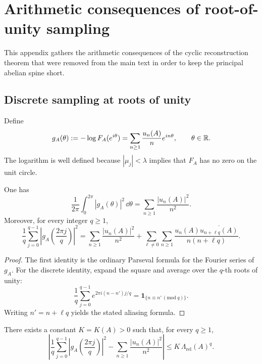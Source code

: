 \section{Arithmetic consequences of root-of-unity sampling}
\label{app:arithmetic}

This appendix gathers the arithmetic consequences of the cyclic reconstruction theorem that were removed from the main text in order to keep the principal abelian spine short.

\subsection{Discrete sampling at roots of unity}

Define
\[
  g_A(\theta):=-\log F_A(e^{i\theta})
  =\sum_{n\ge 1}\frac{u_n(A)}{n}e^{in\theta},
  \qquad \theta\in\mathbb{R}.
\]
The logarithm is well defined because \(|\mu_j|<\lambda\) implies that
\(F_A\) has no zero on the unit circle.

\begin{theorem}
  \label{thm:finite-part-nyquist-parseval-aliasing}
  One has
  \[
    \frac{1}{2\pi}\int_0^{2\pi}|g_A(\theta)|^2\,\dd\theta
    =\sum_{n\ge 1}\frac{|u_n(A)|^2}{n^2}.
  \]
  Moreover, for every integer \(q\ge 1\),
  \[
    \frac{1}{q}\sum_{j=0}^{q-1}
      \left|g_A\!\left(\frac{2\pi j}{q}\right)\right|^2
    =
    \sum_{n\ge 1}\frac{|u_n(A)|^2}{n^2}
    +\sum_{\ell\ne 0}\sum_{n\ge 1}
      \frac{u_n(A)\overline{u_{n+\ell q}(A)}}{n(n+\ell q)}.
  \]
\end{theorem}

\begin{proof}
  The first identity is the ordinary Parseval formula for the Fourier
  series of \(g_A\). For the discrete identity, expand the square and
  average over the \(q\)-th roots of unity:
  \[
    \frac{1}{q}\sum_{j=0}^{q-1}
      e^{2\pi i (n-n')j/q}
    =\mathbf 1_{\{n\equiv n'\,(\mathrm{mod}\ q)\}}.
  \]
  Writing \(n'=n+\ell q\) yields the stated aliasing formula.
\end{proof}

\begin{corollary}
  \label{cor:finite-part-nyquist-error-exp}
  There exists a constant \(K=K(A)>0\) such that, for every \(q\ge 1\),
  \[
    \left|
      \frac{1}{q}\sum_{j=0}^{q-1}
        \left|g_A\!\left(\frac{2\pi j}{q}\right)\right|^2
      -\sum_{n\ge 1}\frac{|u_n(A)|^2}{n^2}
    \right|
    \le K\,\Lambda_{\mathrm{rel}}(A)^q.
  \]
\end{corollary}

